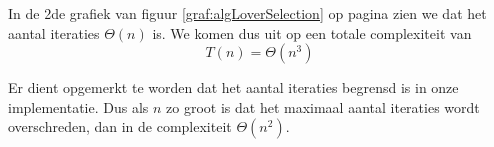 In de 2de grafiek van figuur \ref{graf:algLoverSelection} op pagina \pageref{graf:algLoverSelection} zien we dat het aantal iteraties $\Theta(n)$ is. We komen dus uit op een totale complexiteit van \[T(n)=\Theta\left(n^3\right)\]

Er dient opgemerkt te worden dat het aantal iteraties begrensd is in onze implementatie. Dus als $n$ zo groot is dat het maximaal aantal iteraties wordt overschreden, dan in de complexiteit $\Theta(n^2)$.

%